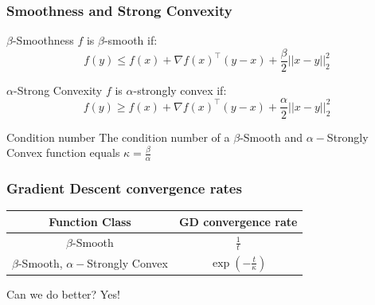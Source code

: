 \documentclass{beamer}
\newcommand\fontbig{\fontsize{15}{7.2}\selectfont}
\begin{document}
\begin{frame}
\frametitle{ Smoothness and Strong Convexity }

\begin{block}{$\beta$-Smoothness}
$f$ is $\beta$-smooth if:
\begin{equation}
f(y) \leq f(x) + \nabla f(x)^\top(y-x)+ \frac{\beta}{2} ||x - y||_2^2
\end{equation}
\end{block}

\begin{block}{$\alpha$-Strong Convexity}
$f$ is $\alpha$-strongly convex if:
\begin{equation}
f(y) \geq f(x) + \nabla f(x)^\top(y-x) + \frac{\alpha}{2} ||x - y||_2^2
\end{equation}
\end{block}

\begin{block}{Condition number}
The condition number of a $\beta$-Smooth and $\alpha-$Strongly Convex function equals $\kappa = \frac{\beta}{\alpha}$
\end{block}
\end{frame}


\begin{frame}
\frametitle{Gradient Descent convergence rates}


\fontbig

\begin{center}
 \begin{tabular}{||c c ||} 
 \hline
 Function Class  & GD convergence rate \\ [0.5ex] 
 \hline\hline
 $\beta$-Smooth  & $\frac{1 }{t}$  \\ [1ex]
 \hline
 $\beta$-Smooth, $\alpha-$Strongly Convex   & $\exp\left(-\frac{t}{\kappa}\right)$  \\[1ex]
 \hline
\end{tabular}

\end{center}

\begin{block}{Can we do better?}
Yes!
\end{block}

\end{frame}
\end{document}

